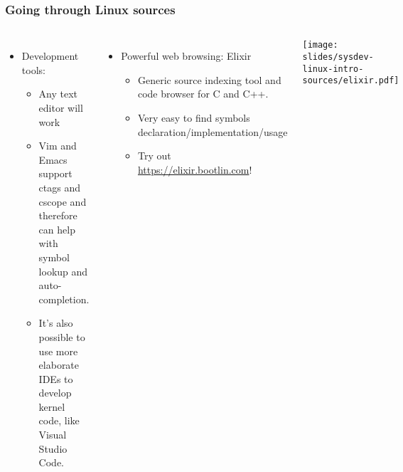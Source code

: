 \begin{frame}
  \frametitle{Going through Linux sources}
  \begin{columns}
    \begin{itemize}
    \item Development tools:
      \begin{itemize}
      \item Any text editor will work
      \item Vim and Emacs support ctags and cscope and therefore can help
        with symbol lookup and auto-completion.
      \item It's also possible to use more elaborate IDEs to develop
        kernel code, like Visual Studio Code.
      \end{itemize}
    \end{itemize}
    \begin{itemize}
    \item Powerful web browsing: Elixir
      \begin{itemize}
      \item Generic source indexing tool and code browser for C and C++.
      \item Very easy to find symbols declaration/implementation/usage
      \item Try out \url{https://elixir.bootlin.com}!
      \end{itemize}
    \end{itemize}
    \begin{center}
      \texttt{[image: slides/sysdev-linux-intro-sources/elixir.pdf]}
    \end{center}
  \end{columns}
\end{frame}

